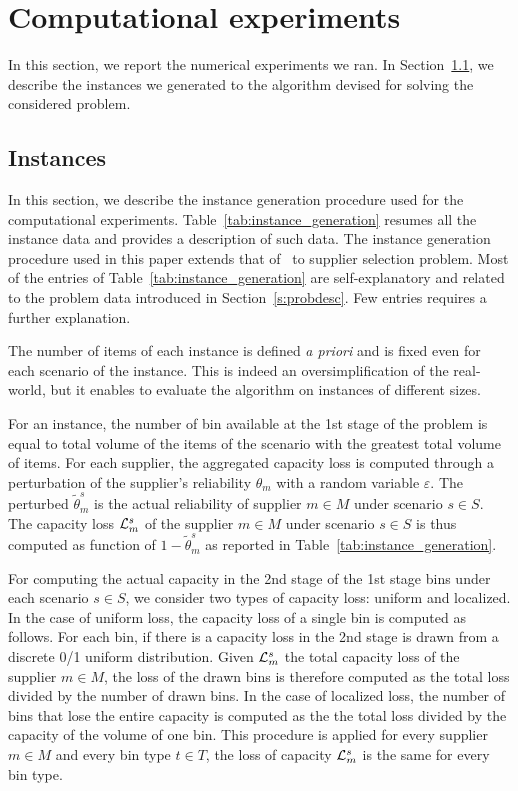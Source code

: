 \documentclass[a4paper,11pt]{article}
\begin{document}
	\section{Computational experiments}\label{s:nexp}
	In this section, we report the numerical experiments we ran.
	In Section~\ref{ss:instances}, we describe the instances we generated to the algorithm devised for solving the considered problem.
	
	{
	\color{blue}
	\subsection{Instances}\label{ss:instances}
	In this section, we describe the instance generation procedure used for the computational experiments.
	Table~\ref{tab:instance_generation} resumes all the instance data and provides a description of such data.
	The instance generation procedure used in this paper extends that of~\cite{crainic2024capacity} to supplier selection problem.
	Most of the entries of Table~\ref{tab:instance_generation} are self-explanatory and related to the problem data introduced in Section~\ref{s:probdesc}.
	Few entries requires a further explanation.
	
	The number of items of each instance is defined \textit{a priori} and is fixed even for each scenario of the instance.
	This is indeed an oversimplification of the real-world, but it enables to evaluate the algorithm on instances of different sizes.
	
	For an instance, the number of bin available at the 1st stage of the problem is equal to total volume of the items of the scenario with the greatest total volume of items.
	For each supplier, the aggregated capacity loss is computed through a perturbation of the supplier's reliability $ \theta_m$ with a random variable $ \varepsilon$.
	The perturbed $ \tilde{\theta}^s_m$ is the actual reliability of supplier $ m \in M$ under scenario $s \in S$.
	The capacity loss $ {\cal L}^s_m$ of the supplier $ m \in M$ under scenario $s \in S$ is thus computed as function of $1 - \tilde{\theta}^s_m$ as reported in Table~\ref{tab:instance_generation}.
	
	For computing the actual capacity in the 2nd stage of the 1st stage bins under each scenario $s \in S$, we consider two types of capacity loss: uniform and localized.
	In the case of uniform loss, the capacity loss of a single bin is computed as follows.
	For each bin, if there is a capacity loss in the 2nd stage is drawn from a discrete 0/1 uniform distribution.
	Given $ {\cal L}^s_m$ the total capacity loss of the supplier $ m \in M$, the loss of the drawn bins is therefore computed as the total loss divided by the number of drawn bins.
	In the case of localized loss, the number of bins that lose the entire capacity is computed as the the total loss divided by the capacity of the volume of one bin.
	This procedure is applied for every supplier $ m \in M$ and every bin type $ t \in T$, the loss of capacity $ {\cal L}^s_m$ is the same for every bin type.
	
}
\end{document}
